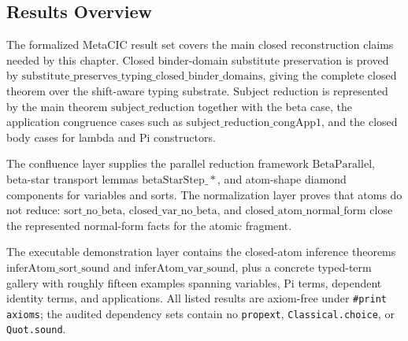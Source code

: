 \subsection{Results Overview}\label{subsec:reconstruction-results-overview}

The formalized MetaCIC result set covers the main closed reconstruction
claims needed by this chapter. Closed binder-domain substitute preservation is
proved by
$\mathrm{substitute\_preserves\_typing\_closed\_binder\_domains}$, giving the
complete closed theorem over the shift-aware typing substrate. Subject
reduction is represented by the main theorem
$\mathrm{subject\_reduction}$ together with the beta case, the application
congruence cases such as $\mathrm{subject\_reduction\_congApp1}$, and the
closed body cases for lambda and Pi constructors.

The confluence layer supplies the parallel reduction framework
$\mathrm{BetaParallel}$, beta-star transport lemmas
$\mathrm{betaStarStep\_*}$, and atom-shape diamond components for variables
and sorts. The normalization layer proves that atoms do not reduce:
$\mathrm{sort\_no\_beta}$, $\mathrm{closed\_var\_no\_beta}$, and
$\mathrm{closed\_atom\_normal\_form}$ close the represented normal-form facts
for the atomic fragment.

The executable demonstration layer contains the closed-atom inference
theorems $\mathrm{inferAtom\_sort\_sound}$ and
$\mathrm{inferAtom\_var\_sound}$, plus a concrete typed-term gallery with
roughly fifteen examples spanning variables, Pi terms, dependent identity
terms, and applications. All listed results are axiom-free under
\texttt{\#print axioms}; the audited dependency sets contain no
\texttt{propext}, \texttt{Classical.choice}, or \texttt{Quot.sound}.

